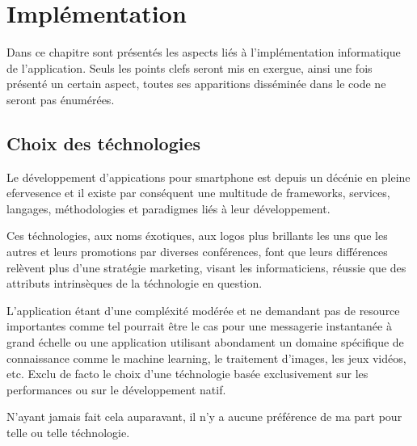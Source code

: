 
\chapter[Programmation]{Implémentation}
    Dans ce chapitre sont présentés les aspects liés à l'implémentation
    informatique de l'application. Seuls les points clefs seront mis en exergue, ainsi 
    une fois présenté un certain aspect, toutes ses apparitions disséminée dans le code
    ne seront pas énumérées. 

    \section{Choix des téchnologies}
    Le développement d'appications
    pour smartphone est depuis un décénie en pleine efervesence et il existe par 
    conséquent une multitude de frameworks, services, langages, méthodologies et paradigmes liés à leur
    développement.

    Ces téchnologies, aux noms éxotiques, aux logos plus brillants les uns que les autres et leurs 
    promotions par diverses conférences, font que leurs différences relèvent plus
    d'une stratégie marketing, visant les informaticiens, réussie que des attributs
    intrinsèques de la téchnologie en question. 

    L'application étant d'une compléxité modérée et ne demandant pas de resource importantes
    comme tel pourrait être le cas pour une messagerie instantanée à grand échelle ou une application
    utilisant abondament un domaine spécifique de connaissance comme le machine learning, le traitement d'images, les jeux vidéos, etc.
    Exclu de facto le choix d'une téchnologie basée exclusivement sur les performances ou sur le développement natif.

    N'ayant jamais fait cela auparavant, il n'y a aucune préférence de ma part pour telle ou telle téchnologie.

